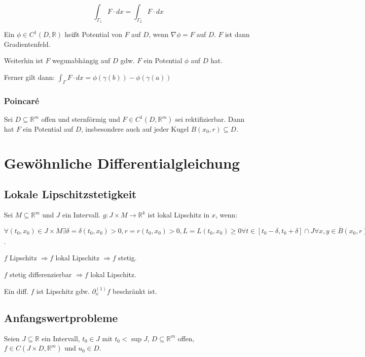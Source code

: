$$\int_{\Gamma_1} F \cdot dx = \int_{\Gamma_2} F \cdot dx$$

Ein $\phi \in C^1(D, \mathbb{R})$ heißt Potential von $F$ auf $D$, wenn $\nabla\phi = F$ auf $D$. $F$ ist dann Gradientenfeld.

Weiterhin ist $F$ wegunabhängig auf $D$ gdw. $F$ ein Potential $\phi$ auf $D$ hat.

Ferner gilt dann: $\int_\Gamma F \cdot dx = \phi(\gamma(b))-\phi(\gamma(a))$

\subsubsection*{Poincar\'e}

Sei $D \subseteq \mathbb{R}^m$ offen und sternförmig und $F \in C^1(D, \mathbb{R}^m)$ sei rektifizierbar. Dann hat $F$ ein Potential auf $D$, insbesondere auch auf jeder Kugel $B(x_0, r) \subseteq D$.

\section*{Gewöhnliche Differentialgleichung}

\subsection*{Lokale Lipschitzstetigkeit}

Sei $M \subseteq \mathbb{R}^m$ und $J$ ein Intervall. $g : J \times M \rightarrow \mathbb{R}^k$ ist lokal Lipschitz in $x$, wenn:

$\forall (t_0, x_0) \in J \times M \exists \delta = \delta(t_0, x_0) > 0, r = r(t_0, x_0) > 0, L = L(t_0, x_0) \geq 0 \forall t \in [t_0 - \delta, t_0 + \delta] \cap J \forall x, y \in \overline B(x_0, r) \cap M : |g(t,x) - g(t, y)|_2 \leq L|x-y|_2$.

$f$ Lipschitz $\Rightarrow f$ lokal Lipschitz $\Rightarrow f$ stetig.

$f$ stetig differenzierbar $\Rightarrow f$ lokal Lipschitz.

Ein diff. $f$ ist Lipschitz gdw. $\partial_x^{(1)} f$ beschränkt ist.

\subsection*{Anfangswertprobleme}

Seien $J \subseteq \mathbb{R}$ ein Intervall, $t_0 \in J$ mit $t_0 < \sup J$, $D \subseteq \mathbb{R}^m$ offen, $f \in C(J \times D, \mathbb{R}^m)$ und $u_0 \in D$.

